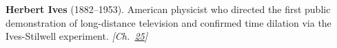 \textbf{Herbert Ives} (1882–1953). American physicist who directed the first public demonstration of long-distance television and confirmed time dilation via the Ives-Stilwell experiment. \emph{[Ch.~\hyperref[ch:fireflybioluminescence]{25}]}

